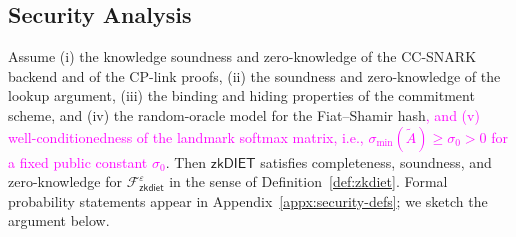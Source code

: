 \documentclass[sigconf,anonymous,review,balance=false]{acmart}
\newcommand{\rev}[1]{{\color{magenta}#1}}
\begin{document}
\rev{%
\subsection{Security Analysis}
\label{sec:security-analysis}

\begin{theorem}[informal]
\label{thm:security}
Assume (i) the knowledge soundness and zero-knowledge of the CC-SNARK
backend and of the CP-link proofs, (ii) the soundness and zero-knowledge of the lookup argument,
(iii) the binding and hiding properties of the commitment scheme, and
(iv) the random-oracle model for the Fiat--Shamir hash\textcolor{magenta}{, and (v) well-conditionedness of the landmark softmax matrix, i.e., $\sigma_{\min}(\tilde{A}) \geq \sigma_0 > 0$ for a fixed public constant $\sigma_0$}. Then
$\mathsf{zkDIET}$ satisfies completeness, soundness, and zero-knowledge
for $\mathcal{F}^{\varepsilon}_{\mathsf{zkdiet}}$ in the sense of
Definition~\ref{def:zkdiet}. Formal probability statements appear in
Appendix~\ref{appx:security-defs}; we sketch the argument below.
\end{theorem}

}
\end{document}
